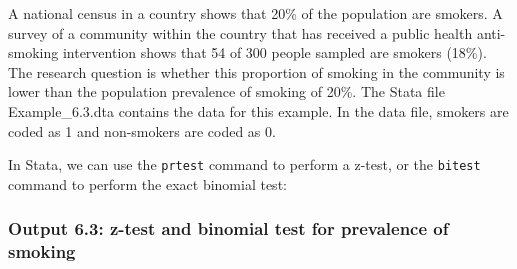 \documentclass[
]{memoir}
\begin{document}
A national census in a country shows that 20\% of the population are smokers. A survey of a community within the country that has received a public health anti-smoking intervention shows that 54 of 300 people sampled are smokers (18\%). The research question is whether this proportion of smoking in the community is lower than the population prevalence of smoking of 20\%. The Stata file Example\_6.3.dta contains the data for this example. In the data file, smokers are coded as 1 and non-smokers are coded as 0.

In Stata, we can use the \texttt{prtest} command to perform a z-test, or the \texttt{bitest} command to perform the exact binomial test:

\hypertarget{output-6.3-z-test-and-binomial-test-for-prevalence-of-smoking}{%
\subsubsection{Output 6.3: z-test and binomial test for prevalence of smoking}\label{output-6.3-z-test-and-binomial-test-for-prevalence-of-smoking}}
\end{document}
